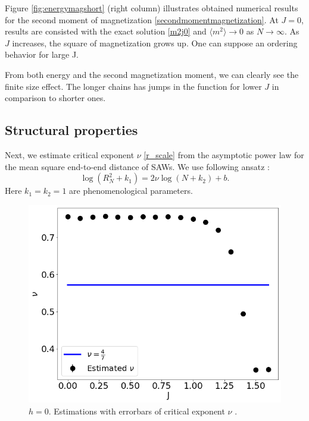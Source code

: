  Figure \ref{fig:energymagshort} (right column) illustrates obtained numerical results for the second moment of magnetization \eqref{secondmomentmagnetization}. At $J=0$, results are consisted with the exact solution \eqref{m2j0} and $  \langle m^2 \rangle  \rightarrow 0$ as $N \rightarrow \infty$. As $J$ increases, the square of magnetization grows up. One can suppose an ordering behavior for large J.
  
  From both energy and the second magnetization moment, we can clearly see the finite size effect. The longer chains has jumps in the function for lower $J$ in comparison to shorter ones. 
 
 
\subsection{Structural properties}

Next, we estimate critical exponent $\nu$ \eqref{r_scale} from the asymptotic power law for the mean square end-to-end distance of SAWs. We use following ansatz  \cite{Berretti1985}:
\begin{equation}
\label{berettiscale}
\log (R_N^2+k_1 ) = 2 \nu \log (N+k_2) + b.
\end{equation}
Here $k_1=k_2=1$ are phenomenological parameters. 
 \begin{figure}[H]
	\centering
	\includegraphics[scale=0.36]{Images/nu_shortchains.png}
	\caption{$h=0$. Estimations with errorbars of critical exponent $\nu$ .   }
	\label{fig:nushort}
\end{figure}
 

